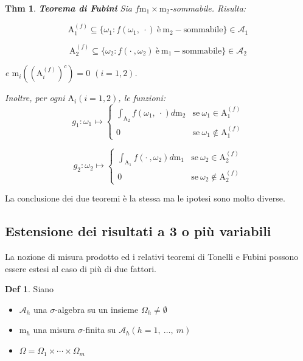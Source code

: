 \documentclass[a4paper,11pt]{article}
\theoremstyle{plain}
\newtheorem{thm}{Thm}[section]
\theoremstyle{definition}
\newtheorem{defn}{Def}[section]
\theoremstyle{remark}
\begin{document}
\begin{thm} \textbf{Teorema di Fubini}
Sia $f\mathrm{m}_{1}\times \mathrm{m}_{2}$-sommabile. Risulta:

$$\mathrm{A}_{1}^{(f)}\subseteq\{ \omega_{1} : f(\omega_{1},\ \cdot) \ \mathrm{è} \ \mathrm{m}_{2}-\mathrm{sommabile}\} \in \mathcal{A}_{1}$$

$$\mathrm{A}_{2}^{(f)}\subseteq \{ \omega_{2} : f(\cdot \ , \omega_{2}) \ \mathrm{è} \ \mathrm{m}_{1}-\mathrm{sommabile}\} \in \mathcal{A}_{2}$$

e $\mathrm{m}_{i}\left((\mathrm{A}_{i}^{(f)})^{c}\right)=0$ $(i=1,2)$.

\noindent
Inoltre, per ogni $\mathrm{A}_{i}(i=1,2)$, le funzioni:
$$
g_{1}:\omega_{1}\mapsto\left\{\begin{array}{ll}
\displaystyle \int_{\mathrm{A}_{2}}f(\omega_{1},\ \cdot)d\mathrm{m}_{2} & \mathrm{s}\mathrm{e}\ \omega_{1}\in \mathrm{A}_{1}^{(f)}\\
0 & \mathrm{s}\mathrm{e}\ \omega_{1}\not\in \mathrm{A}_{1}^{(f)}
\end{array}\right.
$$

$$
g_{2}:\omega_{2}\mapsto\left\{\begin{array}{ll}
\displaystyle \int_{\mathrm{A}_{1}}f(\cdot \ , \omega_{2})d\mathrm{m}_{1} & \mathrm{s}\mathrm{e}\ \omega_{2}\in \mathrm{A}_{2}^{(f)}\\
0 & \mathrm{s}\mathrm{e}\ \omega_{2}\not\in \mathrm{A}_{2}^{(f)}
\end{array}\right.
$$
\end{thm}

\noindent
 La conclusione dei due teoremi è la stessa ma le ipotesi sono molto diverse.



\subsection{Estensione dei risultati a 3 o più variabili}
La nozione di misura prodotto ed $\mathrm{i}$ relativi teoremi di Tonelli $\mathrm{e}$ Fubini possono essere estesi al caso di più di due fattori.

\begin{defn} Siano
\begin{itemize}
\item $\mathcal{A}_{h}$ una $\sigma$-algebra su un insieme $\Omega_{h}\neq \emptyset$ 
\item $\mathrm{m}_{h}$ una misura $\sigma$-finita su $\mathcal{A}_{h}(h=1,\ \ldots,\ m)$
\item $\Omega=\Omega_{1}\times\cdots\times\Omega_{m}$
\end{itemize}
\end{defn}
\end{document}
